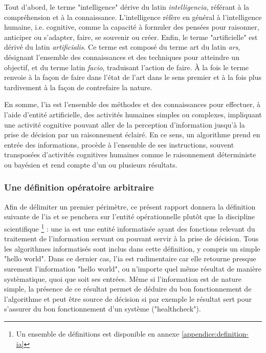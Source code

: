 Tout d'abord, le terme "intelligence" dérive du latin \textit{intelligencia}, référant à la compréhension et à la connaissance. L'intelligence réfère en général à l'intelligence humaine, i.e. cognitive, comme la capacité à formuler des pensées pour raisonner, anticiper ou s'adapter, faire, se souvenir ou créer.
Enfin, le terme "artificielle" est dérivé du latin \textit{artificialis}. Ce terme est composé du terme art du latin \textit{ars}, désignant l'ensemble des connaissances et des techniques pour atteindre un objectif, et du terme latin \textit{facio}, traduisant l'action de faire. À la fois le terme renvoie à la façon de faire dans l'état de l'art dans le sens premier et à la fois plus tardivement à la façon de contrefaire la nature.

En somme, l'\gls{ia} est l'ensemble des méthodes et des connaissances pour effectuer, à l'aide d'entité artificielle, des activités humaines simples ou complexes, impliquant une activité cognitive pouvant aller de la perception d'information jusqu'à la prise de décision par un raisonnement éclairé. En ce sens, un algorithme prend en entrée des informations, procède à l'ensemble de ses instructions, souvent transposées d'activités cognitives humaines comme le raisonnement déterministe ou bayésien et rend compte d'un ou plusieurs résultats.

\subsubsection{Une définition opératoire arbitraire}
Afin de délimiter un premier périmètre, ce présent rapport donnera la définition suivante de l'\gls{ia} et se penchera sur l'entité opérationnelle plutôt que la discipline scientifique \footnote{Un ensemble de définitions est disponible en annexe \ref{appendice:definition-ia}} : une \gls{ia} est une entité informatisée ayant des fonctions relevant du traitement de l'information servant ou pouvant servir à la prise de décision. Tous les algorithmes informatisés sont inclus dans cette définition, y compris un simple "hello world". Dans ce dernier cas, l'\gls{ia} est rudimentaire car elle retourne presque surement l'information "hello world", ou n'importe quel même résultat de manière systèmatique, quoi que soit ses entrées. Même si l'information est de nature simple, la présence de ce résultat permet de déduire du bon fonctionnement de l'algorithme et peut être source de décision si par exemple le résultat sert pour s'assurer du bon fonctionnement d'un système ("healthcheck").

